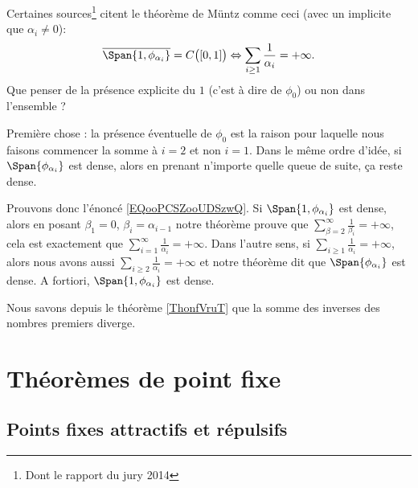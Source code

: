 \begin{remark}      \label{REMooGPYYooCQJwFa}
    Certaines sources\footnote{Dont le rapport du jury 2014} citent le théorème de Müntz comme ceci (avec un implicite que \( \alpha_i\neq 0\)):
    \begin{equation}        \label{EQooPCSZooUDSzwQ}
        \overline{ \Span\{1, \phi_{\alpha_i} \} }=C\big( \mathopen[ 0 , 1 \mathclose] \big) \Leftrightarrow \sum_{i\geq 1}\frac{1}{ \alpha_i }=+\infty.
    \end{equation}
    Que penser de la présence explicite du \( 1\) (c'est à dire de \( \phi_0\)) ou non dans l'ensemble ?

    Première chose : la présence éventuelle de \( \phi_0\) est la raison pour laquelle nous faisons commencer la somme à \( i=2\) et non \( i=1\). Dans le même ordre d'idée, si $\Span\{ \phi_{\alpha_i} \}$  est dense, alors en prenant n'importe quelle queue de suite, ça reste dense.

    Prouvons donc l'énoncé \eqref{EQooPCSZooUDSzwQ}. Si \( \Span\{ 1,\phi_{\alpha_i} \}\) est dense, alors en posant \( \beta_1=0\), \( \beta_i=\alpha_{i-1}\) notre théorème prouve que \( \sum_{\beta=2}^{\infty}\frac{1}{ \beta_i }=+\infty\), cela est exactement que \( \sum_{i=1}^{\infty}\frac{1}{ \alpha_i }=+\infty\). Dans l'autre sens, si \( \sum_{i\geq 1}\frac{1}{ \alpha_i }=+\infty\), alors nous avons aussi \( \sum_{i\geq 2}\frac{1}{ \alpha_i }=+\infty\) et notre théorème dit que \( \Span \{ \phi_{\alpha_i} \}\) est dense. A fortiori, \( \Span\{ 1,\phi_{\alpha_i} \}\) est dense.
\end{remark}

\begin{example}
    Nous savons depuis le théorème \ref{ThonfVruT} que la somme des inverses des nombres premiers diverge.
\end{example}

\section{Théorèmes de point fixe}

\subsection{Points fixes attractifs et répulsifs}

